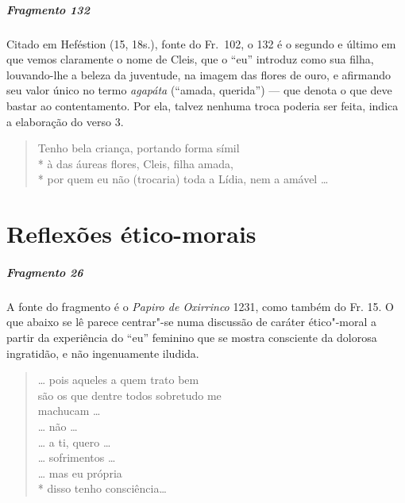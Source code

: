 \paragraph{Fragmento 132}

{\small Citado em Heféstion (15, 18s.), fonte do Fr.~102, o 132 é o segundo e último em que vemos claramente o nome de Cleis, que o “eu” introduz como sua filha, louvando-lhe a
beleza da juventude, na imagem das flores de ouro, e afirmando seu valor único no termo \textit{agapáta} (``amada, querida'') --- que denota o que deve bastar ao contentamento. Por ela,  talvez nenhuma troca poderia ser feita, indica a elaboração do verso 3.}

\begin{verse}
Tenho bela criança, portando forma símil\\*
à das áureas flores, Cleis, filha amada,\\*
por quem eu não (trocaria) toda a Lídia, nem a amável \ldots{}
\end{verse}


\chapter{Reflexões ético-morais}

\paragraph{Fragmento 26}

{\small A fonte do fragmento é o \textit{Papiro de Oxirrinco} 1231, como também do Fr.
15. O que abaixo se lê parece centrar"-se numa discussão de caráter ético"-moral
a partir da experiência do “eu” feminino que se mostra consciente da dolorosa
ingratidão, e não ingenuamente iludida.}

\begin{verse}
\ldots{} pois aqueles a quem trato bem\\
são os que dentre todos sobretudo me\\
machucam \ldots{}\\
\ldots{} não \ldots{}\\
\ldots{} a ti, quero \ldots{}\\
\ldots{} sofrimentos \ldots{}\\
\ldots{} mas eu própria\\*
disso tenho consciência\ldots{}
\end{verse}

